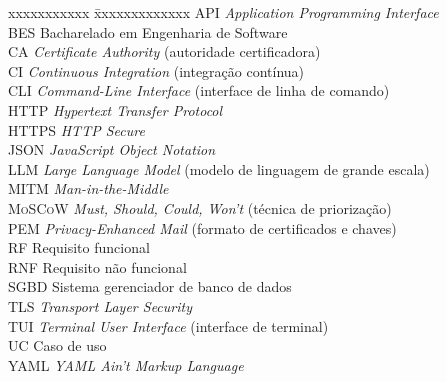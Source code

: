 \ifx\isenglish\undefined
{}
\else
{}
\fi


\begin{tabbing}
xxxxxxxxxxx \= xxxxxxxxxxxxx \kill
\textsc{API}            \> \textit{Application Programming Interface}\\


\textsc{BES}            \> Bacharelado em Engenharia de Software\\
\textsc{CA}            \> \textit{Certificate Authority} (autoridade certificadora)\\
\textsc{CI}            \> \textit{Continuous Integration} (integração contínua)\\
\textsc{CLI}            \> \textit{Command-Line Interface} (interface de linha de comando)\\
\textsc{HTTP}            \> \textit{Hypertext Transfer Protocol}\\
\textsc{HTTPS}            \> \textit{HTTP Secure}\\
\textsc{JSON}            \> \textit{JavaScript Object Notation}\\
\textsc{LLM}            \> \textit{Large Language Model} (modelo de linguagem de grande escala)\\
\textsc{MITM}            \> \textit{Man-in-the-Middle}\\
\textsc{MoSCoW}            \> \textit{Must, Should, Could, Won't} (técnica de priorização)\\
\textsc{PEM}            \> \textit{Privacy-Enhanced Mail} (formato de certificados e chaves)\\
\textsc{RF}            \> Requisito funcional\\
\textsc{RNF}            \> Requisito não funcional\\
\textsc{SGBD}            \> Sistema gerenciador de banco de dados\\
\textsc{TLS}            \> \textit{Transport Layer Security}\\
\textsc{TUI}            \> \textit{Terminal User Interface} (interface de terminal)\\
\textsc{UC}            \> Caso de uso\\
\textsc{YAML}            \> \textit{YAML Ain't Markup Language}

\end{tabbing}

